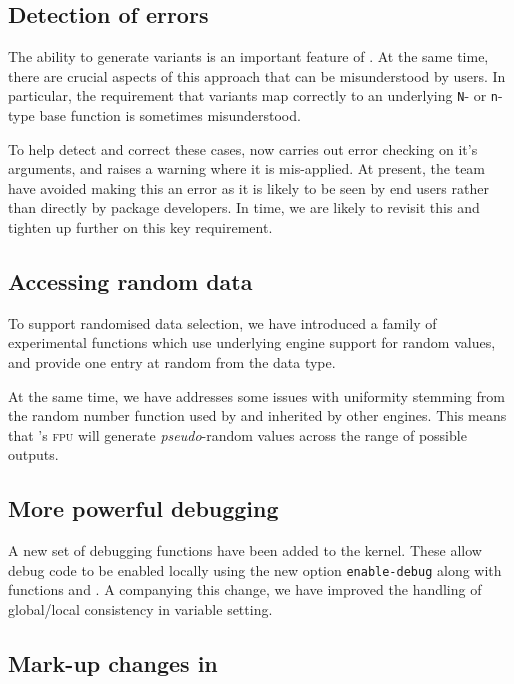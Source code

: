 \documentclass{ltnews}
\begin{document}
\subsection{Detection of  errors}

The ability to generate variants is an important feature of . At
the same time,  there are crucial aspects of this approach that can be
misunderstood by users. In particular, the requirement that variants map
correctly to an underlying \verb|N|- or \verb|n|-type base function is sometimes
misunderstood.

To help detect and correct these cases,  now
carries out error checking on it's arguments, and raises a warning where
it is mis-applied. At present, the team have avoided making this an error
as it is likely to be seen by end users rather than directly by package
developers. In time, we are likely to revisit this and tighten up
further on this key requirement.

\subsection{Accessing random data}

To support randomised data selection, we have introduced a family of
experimental functions which use underlying engine support for random values,
and provide one entry at random from the data type.

At the same time, we have addresses some issues with uniformity stemming from
the random number function used by  and inherited by other
engines. This means that 's \textsc{fpu} will generate \emph{pseudo}-random
values across the range of possible outputs.

\subsection{More powerful debugging}

A new set of debugging functions have been added to the kernel. These allow
debug code to be enabled locally using the new option \verb|enable-debug| along
with functions  and . A companying this change, we
have improved the handling of global/local consistency in variable setting.

\subsection{Mark-up changes in }
\end{document}
